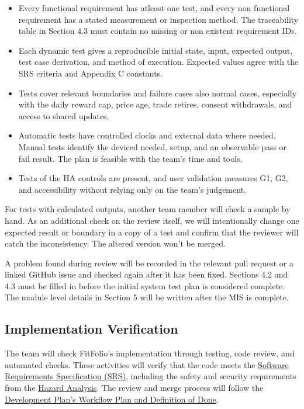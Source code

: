 \documentclass[12pt, titlepage]{article}
\begin{document}
\begin{itemize}
  \item Every functional requirement has atleast one test, and every non functional requirement has a stated measurement or inspection method. The traceability table in Section 4.3 must contain no missing or non existent requirement IDs.
  \item Each dynamic test gives a reproducible initial state, input, expected output, test case derivation, and method of execution. Expected values agree with the SRS criteria and Appendix C constants. 
  \item Tests cover relevant boundaries and failure cases also normal cases, especially with the daily reward cap, price age, trade retires, consent withdrawals, and access to shared updates.
  \item Automatic tests have controlled clocks and external data where needed. Manual tests identify the deviced needed, setup, and an observable pass or fail result. The plan is feasible with the team's time and tools.
  \item Tests of the HA controls are present, and user validation measures G1, G2, and accessibility without relying only on the team's judgement.
\end{itemize}

For tests with calculated outputs, another team member will check a sample by hand. As an additional check on the review itself, we will intentionally change one expected result or boundary in a copy of a test and confirm that the reviewer will catch the inconsistency. The altered version won't be merged. 

A problem found during review will be recorded in the relevant pull request or a linked GitHub issue and checked again after it has been fixed. Sections 4.2 and 4.3 must be filled in before the initial system test plan is considered complete. The module level details in Section 5 will be written after the MIS is complete.

\subsection{Implementation Verification}

The team will check FitFolio's implementation through testing, code review, and automated checks. These activities will verify that the code meets the \href{https://github.com/davislenover/BurnNEarn/blob/main/pdfs/SRS-IEEE/SRS.pdf}{Software Requirements Specification (SRS)}, including the safety and security requirements from the \href{https://github.com/davislenover/BurnNEarn/blob/main/pdfs/HazardAnalysis/HazardAnalysis.pdf}{Hazard Analysis}. The review and merge process will follow the \href{https://github.com/davislenover/BurnNEarn/blob/main/pdfs/DevelopmentPlan/DevelopmentPlan.pdf}{Development Plan's Workflow Plan and Definition of Done}.
\end{document}
